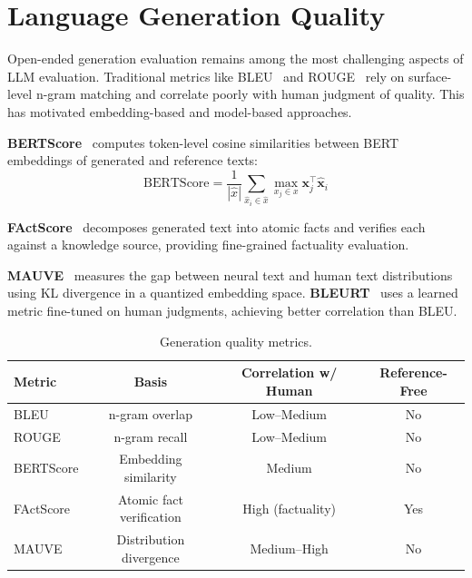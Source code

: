 \documentclass[11pt]{article}
\begin{document}
\section{Language Generation Quality}
\label{sec:generation}

Open-ended generation evaluation remains among the most challenging aspects of LLM evaluation. Traditional metrics like BLEU~\cite{papineau2002bleu} and ROUGE~\cite{lin2004rouge} rely on surface-level n-gram matching and correlate poorly with human judgment of quality. This has motivated embedding-based and model-based approaches.

\textbf{BERTScore}~\cite{zhang2020bertscore} computes token-level cosine similarities between BERT embeddings of generated and reference texts:
\begin{equation}
\text{BERTScore} = \frac{1}{|\hat{x}|} \sum_{\hat{x}_i \in \hat{x}} \max_{x_j \in x} \mathbf{x}_j^\top \hat{\mathbf{x}}_i
\end{equation}

\textbf{FActScore}~\cite{min2023factscore} decomposes generated text into atomic facts and verifies each against a knowledge source, providing fine-grained factuality evaluation.

\textbf{MAUVE}~\cite{pillutla2021mauve} measures the gap between neural text and human text distributions using KL divergence in a quantized embedding space. \textbf{BLEURT}~\cite{sellam2020bleurt} uses a learned metric fine-tuned on human judgments, achieving better correlation than BLEU.

\begin{table}[h]
\centering
\caption{Generation quality metrics.}
\small
\begin{tabular}{@{}lccc@{}}
\toprule
\textbf{Metric} & \textbf{Basis} & \textbf{Correlation w/ Human} & \textbf{Reference-Free} \\
\midrule
BLEU & n-gram overlap & Low--Medium & No \\
ROUGE & n-gram recall & Low--Medium & No \\
BERTScore & Embedding similarity & Medium & No \\
FActScore & Atomic fact verification & High (factuality) & Yes \\
MAUVE & Distribution divergence & Medium--High & No \\
\bottomrule
\end{tabular}
\end{table}
\end{document}

